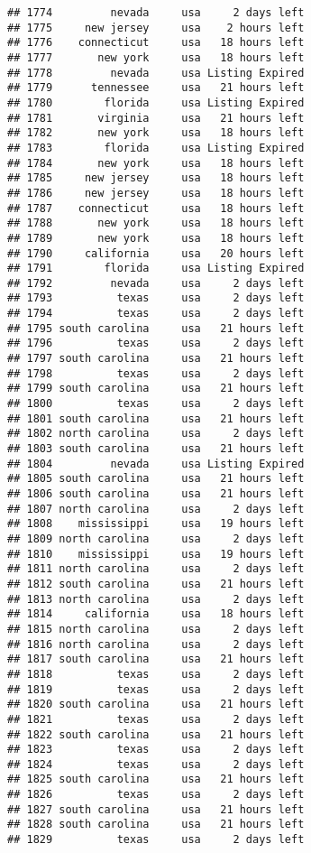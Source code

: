 \documentclass[
]{article}
\begin{document}
\begin{verbatim}
## 1774         nevada     usa     2 days left
## 1775     new jersey     usa    2 hours left
## 1776    connecticut     usa   18 hours left
## 1777       new york     usa   18 hours left
## 1778         nevada     usa Listing Expired
## 1779      tennessee     usa   21 hours left
## 1780        florida     usa Listing Expired
## 1781       virginia     usa   21 hours left
## 1782       new york     usa   18 hours left
## 1783        florida     usa Listing Expired
## 1784       new york     usa   18 hours left
## 1785     new jersey     usa   18 hours left
## 1786     new jersey     usa   18 hours left
## 1787    connecticut     usa   18 hours left
## 1788       new york     usa   18 hours left
## 1789       new york     usa   18 hours left
## 1790     california     usa   20 hours left
## 1791        florida     usa Listing Expired
## 1792         nevada     usa     2 days left
## 1793          texas     usa     2 days left
## 1794          texas     usa     2 days left
## 1795 south carolina     usa   21 hours left
## 1796          texas     usa     2 days left
## 1797 south carolina     usa   21 hours left
## 1798          texas     usa     2 days left
## 1799 south carolina     usa   21 hours left
## 1800          texas     usa     2 days left
## 1801 south carolina     usa   21 hours left
## 1802 north carolina     usa     2 days left
## 1803 south carolina     usa   21 hours left
## 1804         nevada     usa Listing Expired
## 1805 south carolina     usa   21 hours left
## 1806 south carolina     usa   21 hours left
## 1807 north carolina     usa     2 days left
## 1808    mississippi     usa   19 hours left
## 1809 north carolina     usa     2 days left
## 1810    mississippi     usa   19 hours left
## 1811 north carolina     usa     2 days left
## 1812 south carolina     usa   21 hours left
## 1813 north carolina     usa     2 days left
## 1814     california     usa   18 hours left
## 1815 north carolina     usa     2 days left
## 1816 north carolina     usa     2 days left
## 1817 south carolina     usa   21 hours left
## 1818          texas     usa     2 days left
## 1819          texas     usa     2 days left
## 1820 south carolina     usa   21 hours left
## 1821          texas     usa     2 days left
## 1822 south carolina     usa   21 hours left
## 1823          texas     usa     2 days left
## 1824          texas     usa     2 days left
## 1825 south carolina     usa   21 hours left
## 1826          texas     usa     2 days left
## 1827 south carolina     usa   21 hours left
## 1828 south carolina     usa   21 hours left
## 1829          texas     usa     2 days left

\end{verbatim}
\end{document}
